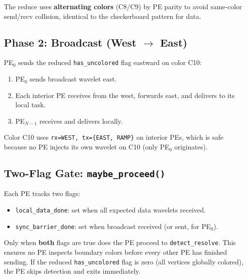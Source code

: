 \documentclass[11pt,letterpaper]{article}
\begin{document}
The reduce uses \textbf{alternating colors} (C8/C9) by PE parity to avoid same-color send/recv collision, identical to the checkerboard pattern for data.

\subsection{Phase 2: Broadcast (West $\to$ East)}

PE$_0$ sends the reduced \texttt{has\_uncolored} flag eastward on color C10:

\begin{enumerate}[nosep]
  \item PE$_0$ sends broadcast wavelet east.
  \item Each interior PE receives from the west, forwards east, and delivers to its local task.
  \item PE$_{N-1}$ receives and delivers locally.
\end{enumerate}

Color C10 uses \texttt{rx=WEST, tx=\{EAST, RAMP\}} on interior PEs, which is safe because no PE injects its own wavelet on C10 (only PE$_0$ originates).

\subsection{Two-Flag Gate: \texttt{maybe\_proceed()}}

Each PE tracks two flags:
\begin{itemize}[nosep]
  \item \texttt{local\_data\_done}: set when all expected data wavelets received.
  \item \texttt{sync\_barrier\_done}: set when broadcast received (or sent, for PE$_0$).
\end{itemize}

Only when \textbf{both} flags are true does the PE proceed to \texttt{detect\_resolve}. This ensures no PE inspects boundary colors before every other PE has finished sending. If the reduced \texttt{has\_uncolored} flag is zero (all vertices globally colored), the PE skips detection and exits immediately.

\begin{center}
\end{center}
\end{document}

